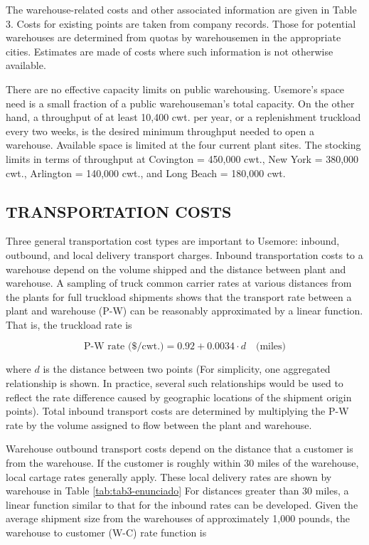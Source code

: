 \documentclass[12pt,a4paper]{article}
\begin{document}
The warehouse-related costs and other associated information are given in Table 3.
Costs for existing points are taken from company records.
Those for potential warehouses are determined from quotas by warehousemen in the appropriate cities.
Estimates are made of costs where such information is not otherwise available.

There are no effective capacity limits on public warehousing.
Usemore's space need is a small fraction of a public warehouseman's total capacity.
On the other hand, a throughput of at least 10,400 cwt. per year, or a replenishment truckload every two weeks, is the desired minimum throughput needed to open a warehouse.
Available space is limited at the four current plant sites.
The stocking limits in terms of throughput at Covington = 450,000 cwt., New York = 380,000 cwt., Arlington = 140,000 cwt., and Long Beach = 180,000 cwt.

\subsection{TRANSPORTATION COSTS}

Three general transportation cost types are important to Usemore: inbound, outbound, and local delivery transport charges.
Inbound transportation costs to a warehouse depend on the volume shipped and the distance between plant and warehouse.
A sampling of truck common carrier rates at various distances from the plants for full truckload shipments shows that the transport rate between a plant and warehouse (P-W) can be reasonably approximated by a linear function.
That is, the truckload rate is

\begin{equation}
    \text{P-W rate (\$/cwt.)} = 0.92 + 0.0034 \cdot d \quad \text{(miles)}
\end{equation}

where $d$ is the distance between two points (For simplicity, one aggregated relationship is shown.
In practice, several such relationships would be used to reflect the rate difference caused by geographic locations of the shipment origin points).
Total inbound transport costs are determined by multiplying the P-W rate by the volume assigned to flow between the plant and warehouse.

Warehouse outbound transport costs depend on the distance that a customer is from the warehouse.
If the customer is roughly within 30 miles of the warehouse, local cartage rates generally apply.
These local delivery rates are shown by warehouse in Table \ref{tab:tab3-enunciado}
For distances greater than 30 miles, a linear function similar to that for the inbound rates can be developed.
Given the average shipment size from the warehouses of approximately 1,000 pounds, the
warehouse to customer (W-C) rate function is
\end{document}
